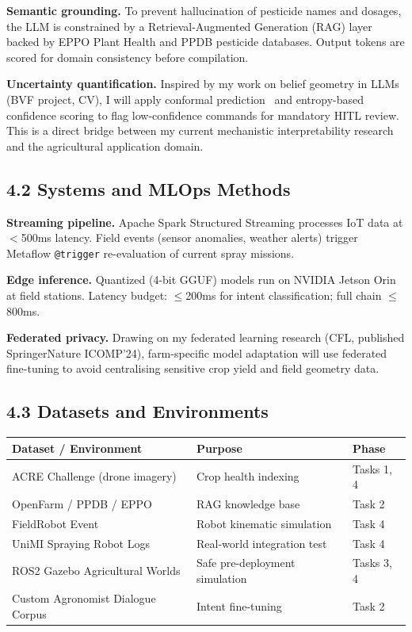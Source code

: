 \documentclass[11pt,a4paper]{article}
\begin{document}
\textbf{Semantic grounding.} To prevent hallucination of pesticide names and dosages,
the LLM is constrained by a Retrieval-Augmented Generation (RAG) layer backed by
EPPO Plant Health and PPDB pesticide databases. Output tokens are scored for domain
consistency before compilation.

\textbf{Uncertainty quantification.} Inspired by my work on belief geometry in LLMs
(BVF project, CV), I will apply conformal prediction~\cite{shafer_vovk_2008} and
entropy-based confidence scoring to flag low-confidence commands for mandatory HITL review.
This is a direct bridge between my current mechanistic interpretability research and
the agricultural application domain.

\subsection{4.2 Systems and MLOps Methods}

\textbf{Streaming pipeline.} Apache Spark Structured Streaming processes IoT data at
$<$500ms latency. Field events (sensor anomalies, weather alerts) trigger Metaflow
\texttt{@trigger} re-evaluation of current spray missions.

\textbf{Edge inference.} Quantized (4-bit GGUF) models run on NVIDIA Jetson Orin at field
stations. Latency budget: $\leq$200ms for intent classification; full chain $\leq$800ms.

\textbf{Federated privacy.} Drawing on my federated learning research (CFL, published
SpringerNature ICOMP'24), farm-specific model adaptation will use federated fine-tuning
to avoid centralising sensitive crop yield and field geometry data.

\subsection{4.3 Datasets and Environments}

\begin{tabularx}{\textwidth}{@{}lXl@{}}
  \toprule
  \textbf{Dataset / Environment} & \textbf{Purpose} & \textbf{Phase} \\
  \midrule
  ACRE Challenge (drone imagery) & Crop health indexing & Tasks 1, 4 \\
  OpenFarm / PPDB / EPPO & RAG knowledge base & Task 2 \\
  FieldRobot Event & Robot kinematic simulation & Task 4 \\
  UniMI Spraying Robot Logs & Real-world integration test & Task 4 \\
  ROS2 Gazebo Agricultural Worlds & Safe pre-deployment simulation & Tasks 3, 4 \\
  Custom Agronomist Dialogue Corpus & Intent fine-tuning & Task 2 \\
  \bottomrule
\end{tabularx}
\end{document}
